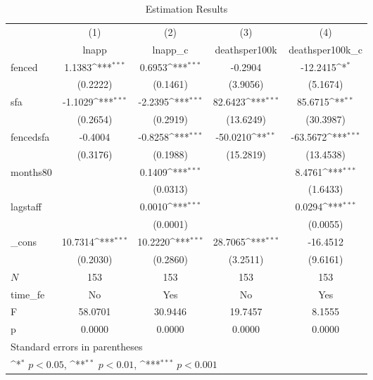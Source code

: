 \begin{table}[htbp]\centering
\def\sym#1{\ifmmode^{#1}\else\(^{#1}\)\fi}
\caption{Estimation Results \label{tab:table1}}
\begin{tabular}{l*{4}{c}}
\hline\hline
            &\multicolumn{1}{c}{(1)}&\multicolumn{1}{c}{(2)}&\multicolumn{1}{c}{(3)}&\multicolumn{1}{c}{(4)}\\
            &\multicolumn{1}{c}{lnapp}&\multicolumn{1}{c}{lnapp\_c}&\multicolumn{1}{c}{deathsper100k}&\multicolumn{1}{c}{deathsper100k\_c}\\
\hline
fenced      &      1.1383\sym{***}&      0.6953\sym{***}&     -0.2904         &    -12.2415\sym{*}  \\
            &    (0.2222)         &    (0.1461)         &    (3.9056)         &    (5.1674)         \\
[1em]
sfa         &     -1.1029\sym{***}&     -2.2395\sym{***}&     82.6423\sym{***}&     85.6715\sym{**} \\
            &    (0.2654)         &    (0.2919)         &   (13.6249)         &   (30.3987)         \\
[1em]
fencedsfa   &     -0.4004         &     -0.8258\sym{***}&    -50.0210\sym{**} &    -63.5672\sym{***}\\
            &    (0.3176)         &    (0.1988)         &   (15.2819)         &   (13.4538)         \\
[1em]
months80    &                     &      0.1409\sym{***}&                     &      8.4761\sym{***}\\
            &                     &    (0.0313)         &                     &    (1.6433)         \\
[1em]
lagstaff    &                     &      0.0010\sym{***}&                     &      0.0294\sym{***}\\
            &                     &    (0.0001)         &                     &    (0.0055)         \\
[1em]
\_cons      &     10.7314\sym{***}&     10.2220\sym{***}&     28.7065\sym{***}&    -16.4512         \\
            &    (0.2030)         &    (0.2860)         &    (3.2511)         &    (9.6161)         \\
\hline
\(N\)       &         153         &         153         &         153         &         153         \\
time\_fe     &          No         &         Yes         &          No         &         Yes         \\
F           &     58.0701         &     30.9446         &     19.7457         &      8.1555         \\
p           &      0.0000         &      0.0000         &      0.0000         &      0.0000         \\
\hline\hline
\multicolumn{5}{l}{\footnotesize Standard errors in parentheses}\\
\multicolumn{5}{l}{\footnotesize \sym{*} \(p<0.05\), \sym{**} \(p<0.01\), \sym{***} \(p<0.001\)}\\
\end{tabular}
\end{table}
